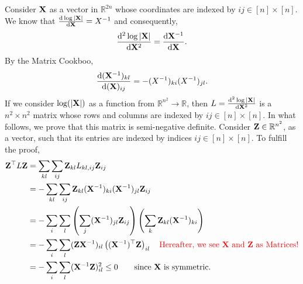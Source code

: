 \documentclass[12pt, fullpage,letterpaper]{article}
\def\red{\color{red}}
\def\blackblue{\color{black!40!blue}}
\begin{document}
{\blackblue\noindent Consider ${\bf X}$ as a vector in $\mathbb{R}^{2n}$ whose coordinates are indexed by ${ij}\in[n]\times [n]$. 
We know that $\frac{{\rm d} \log|{\bf X}|}{{\rm d} {\bf X}} = X^{-1}$ and consequently, 
$$\frac{{\rm d}^2 \log|{\bf X}|}{{\rm d} {\bf X}^2}  =\frac{{\rm d} {\bf X}^{-1}}{{\rm d} {\bf X}}.$$
By the Matrix Cookboo, 
$$\frac{{\rm d} ({\bf X}^{-1})_{kl}}{{\rm d} ({\bf X})_{ij}} = -(X^{-1})_{ki}(X^{-1})_{jl}.$$
If we consider $\log(|{\bf X}|)$ as a function from $\mathbb{R}^{n^2}\longrightarrow \mathbb{R}$, then 
$L = \frac{{\rm d}^2 \log|{\bf X}|}{{\rm d} {\bf X}^2}$  is a $n^2\times n^2$ matrix whose rows and columns are indexed  by ${ij}\in[n]\times [n]$. 
In what follows, we prove that this matrix is semi-negative definite. Consider ${\bf Z}\in \mathbb{R}^{n^2}$, as a vector, such that its entries are indexed by indices  ${ij}\in[n]\times [n]$. To fulfill the proof, 
\begin{align*}
\Z^\top L\Z & = \sum_{kl}\sum_{ij}\Z_{kl}L_{kl,ij}\Z_{ij}\\
& = -\sum_{kl}\sum_{ij}\Z_{kl}(\X^{-1})_{ki}(\X^{-1})_{jl}\Z_{ij}\\
& = - \sum_{i}\sum_{l}\left(\sum_{j}(\X^{-1})_{jl}\Z_{ij}\right)\left(\sum_{k}\Z_{kl}(\X^{-1})_{ki}\right)\\
& = - \sum_{i}\sum_{l} (\Z\X^{-1})_{il}\left((\X^{-1})^\top\Z\right)_{il}\quad \mbox{\red Hereafter, we see $\X$ and $\Z$ as Matrices!}\\
& = - \sum_{i}\sum_{l} (\X^{-1}\Z)_{il}^2 \leq 0 \quad\quad \mbox{since $\X$ is symmetric.}
\end{align*}
}
\end{document}

